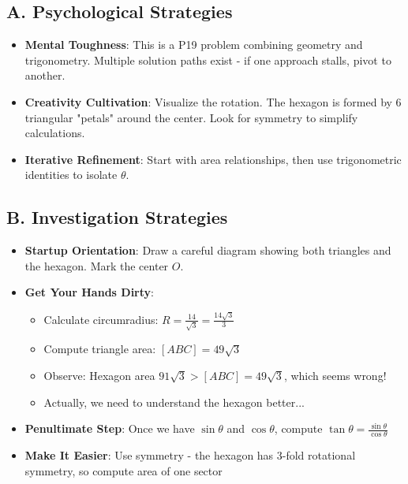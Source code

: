 \documentclass[12pt]{article}
\begin{document}
\begin{strategicbox}
\subsection*{A. Psychological Strategies}
\begin{itemize}[leftmargin=*]
    \item \textbf{Mental Toughness}: This is a P19 problem combining geometry and trigonometry. Multiple solution paths exist - if one approach stalls, pivot to another.
    
    \item \textbf{Creativity Cultivation}: Visualize the rotation. The hexagon is formed by 6 triangular "petals" around the center. Look for symmetry to simplify calculations.
    
    \item \textbf{Iterative Refinement}: Start with area relationships, then use trigonometric identities to isolate $\theta$.
\end{itemize}

\subsection*{B. Investigation Strategies}
\begin{itemize}[leftmargin=*]
    \item \textbf{Startup Orientation}: Draw a careful diagram showing both triangles and the hexagon. Mark the center $O$.
    
    \item \textbf{Get Your Hands Dirty}: 
    \begin{itemize}
        \item Calculate circumradius: $R = \frac{14}{\sqrt{3}} = \frac{14\sqrt{3}}{3}$
        \item Compute triangle area: $[ABC] = 49\sqrt{3}$
        \item Observe: Hexagon area $91\sqrt{3} > [ABC] = 49\sqrt{3}$, which seems wrong!
        \item Actually, we need to understand the hexagon better...
    \end{itemize}
    
    \item \textbf{Penultimate Step}: Once we have $\sin\theta$ and $\cos\theta$, compute $\tan\theta = \frac{\sin\theta}{\cos\theta}$
    
    \item \textbf{Make It Easier}: Use symmetry - the hexagon has 3-fold rotational symmetry, so compute area of one sector
    

\end{itemize}
\end{strategicbox}
\end{document}
